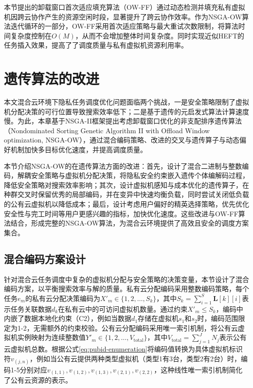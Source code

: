 本节提出的卸载窗口首次适应填充算法（OW-FF）通过动态检测并填充私有虚拟机因跨云协作产生的资源空闲时段，显著提升了跨云协作效率。作为NSGA-OW算法迭代循环的一部分，OW-FF采用首次适应策略与最大重试次数限制，将算法时间复杂度控制在$O(M)$，从而不会增加整体时间复杂度。同时实现近似HEFT的任务插入效果，提高了了调度质量与私有虚拟机资源利用率。

\section{遗传算法的改进}\label{sec:nsga}

本文混合云环境下隐私任务调度优化问题面临两个挑战，一是安全策略限制了虚拟机分配决策的可行位置导致搜索效率低下；二是基于遗传的元启发式算法计算速度慢。为此，本章基于NSGA-II框架提出考虑卸载窗口优化的非支配排序遗传算法（Nondominated Sorting Genetic Algorithm II with Offload Window optimization, NSGA-OW），通过混合编码策略、改进的交叉与遗传算子与动态偏好机制加快多目标优化速度，并提高调度质量。

本节介绍NSGA-OW的在遗传算法方面的改进：首先，设计了混合二进制与整数编码，解耦安全策略与虚拟机分配决策，将隐私安全约束嵌入遗传个体编解码过程，降低安全策略对搜索效率影响；其次，设计虚拟机感知与成本优化的遗传算子，在种群交叉时保留优秀的局部编码，并在变异中快速均衡负载，同时尝试关闭低负载的公有云虚拟机以降低成本；最后，设计考虑用户偏好的精英选择策略，优先优化安全性与完工时间等用户更感兴趣的指标，加快优化速度。这些改进与OW-FF算法结合，形成完整的NSGA-OW算法，为混合云环境提供了高效且安全的调度方案集合。

\subsection{混合编码方案设计}\label{subsec:nsga-encoding}

针对混合云任务调度中复杂的虚拟机分配与安全策略的决策变量，本节设计了混合编码方案，以平衡搜索效率与解的质量。私有云分配编码采用整数编码策略，每个任务\(e_m\)的私有云分配决策编码为\(X'_m \in \{1,2,\dots,S_k\}\)，其中\(S_k = \sum_{i=1}^S \mathbf{L}[k][i]\)表示任务关联数据\(d_k\)在私有云中的可访问虚拟机数量。通过约束\(X'_m \leq S_k\)，编码中内嵌了数据本地化约束（C2），例如当数据\(d_1\)存储在虚拟机\(s_1\)和\(s_2\)时，编码范围限定为1-2，无需额外的约束校验。公有云分配编码采用唯一索引机制，将公有云虚拟机实例映射为连续整数值\(Y'_m \in \{1,2,\dots,V_{\text{total}}\}\)，其中\(V_{\text{total}} = \sum_{j=1}^J N_j\)表示公有云虚拟机总数。根据公式\eqref{eq:pubid-enumeration}将编码值转换为具体虚拟机标识符\(v_{(j,n)}\)，例如当公有云提供两种类型虚拟机（类型1有3台，类型2有2台）时，编码1-5分别对应\(v_{(1,1)}, v_{(1,2)}, v_{(1,3)}, v_{(2,1)}, v_{(2,2)}\)，这种线性唯一索引机制简化了公有云资源的表示。

